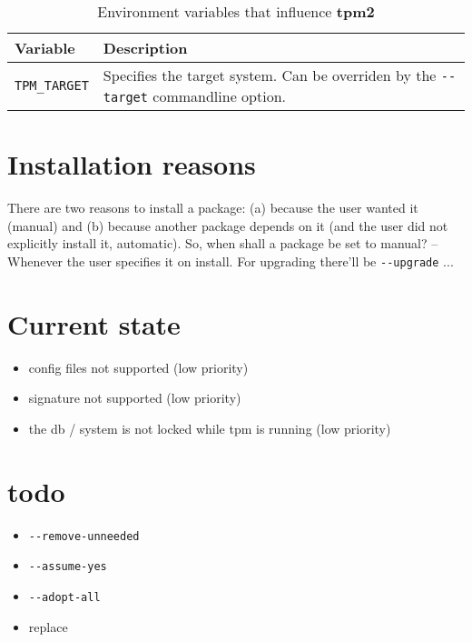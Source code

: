 \documentclass[a4paper]{scrartcl}
\newcommand{\program}[1]{\textbf{#1}}
\begin{document}
	\begin{table}[ht]
		\centering
		
		\begin{tabularx}{.9\textwidth}{l|X}
			Variable & Description \\
			\hline
			\texttt{TPM\_TARGET} & Specifies the target system. Can be overriden by the \texttt{-{}-target} commandline option. \\
		\end{tabularx}
	
		\caption{Environment variables that influence \program{tpm2}}
		\label{tab:environment_variables_for_tpm2}
	\end{table}


	\section{Installation reasons}
	\label{sec:installation_reasons}
	
	There are two reasons to install a package: (a) because the user wanted it (manual) and (b) because another package depends on it (and the user did not explicitly install it, automatic). So, when shall a package be set to manual? -- Whenever the user specifies it on install. For upgrading there'll be \texttt{-{}-upgrade} ...






	\section{Current state}
	\label{sec:current_state}
	
	\begin{itemize}
		\item config files not supported (low priority)
		\item signature not supported (low priority)
		\item the db / system is not locked while tpm is running (low priority)
	\end{itemize}

	\section{todo}
	\label{sec:todo}
	
	\begin{itemize}
		\item \texttt{-{}-remove-unneeded}
		\item \texttt{-{}-assume-yes}
		\item \texttt{-{}-adopt-all}
		\item replace
	\end{itemize}
	
\end{document}
